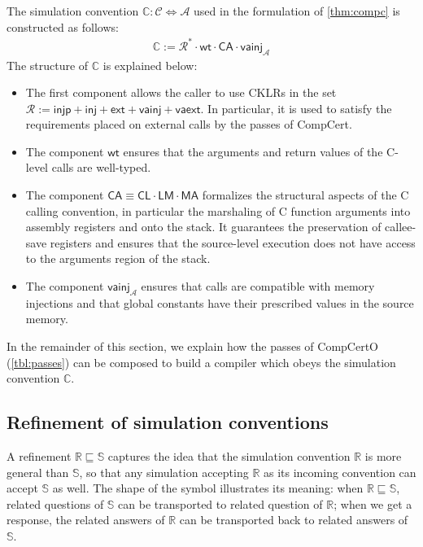 \documentclass[sigplan,screen]{acmart}
\newcommand{\kw}[1]{\ensuremath{ \mathsf{#1} }}
\newcommand{\screfd}{\sqsubseteq}
\newcommand{\cc}[2]{{ \kw{#1#2} }}
\begin{document}

The simulation convention
$\mathbb{C} : \mathcal{C} \Leftrightarrow \mathcal{A}$
used in the formulation of \autoref{thm:compc}
is constructed as follows:
\[
  \begin{array}{c}
  \mathbb{C} :=
    \mathcal{R}^* \cdot
    \kw{wt} \cdot
    \cc{C}{A} \cdot
    \kw{vainj}_{\!\mathcal{A}}
  \end{array}
\]
The structure of $\mathbb{C}$
is explained below:
\begin{itemize}
\item
The first component
allows the caller to 
use CKLRs in the set
$
  \mathcal{R} := \kw{injp} + \kw{inj} + \kw{ext} + \kw{vainj} + \kw{vaext}
$.
In particular,
it is used to satisfy the requirements
placed on external calls by the passes of CompCert.
\item
The component \kw{wt}
ensures that the arguments and return values of the C-level calls are well-typed.
\item
The component
$\cc{C}{A} \equiv \cc{C}{L} \cdot \cc{L}{M} \cdot \cc{M}{A}$
formalizes the structural aspects of
the C calling convention,
in particular
the marshaling of C function arguments
into assembly registers and onto the stack.
It guarantees the preservation of
callee-save registers
and ensures that the source-level execution
does not have access to the arguments region
of the stack.
\item
The component
$\kw{vainj}_{\!\mathcal{A}}$
ensures that calls are compatible with memory injections
and that global constants have their prescribed values
in the source memory.
\end{itemize}

In the remainder of this section,
we explain how the passes of CompCertO
(\autoref{tbl:passes})
can be composed to build a compiler
which obeys the simulation convention $\mathbb{C}$.


\subsection{Refinement of simulation conventions} \label{sec:scref} %

A refinement $\mathbb{R} \screfd \mathbb{S}$
captures the idea that the simulation convention $\mathbb{R}$
is more general than $\mathbb{S}$,
so that any simulation accepting $\mathbb{R}$ as its
incoming convention can accept $\mathbb{S}$ as well.
The shape of the symbol illustrates its meaning:
when $\mathbb{R} \screfd \mathbb{S}$,
related questions of $\mathbb{S}$ can be transported to
related question of $\mathbb{R}$;
when we get a response, the
related answers of $\mathbb{R}$ can be transported back to
related answers of $\mathbb{S}$.
\end{document}
